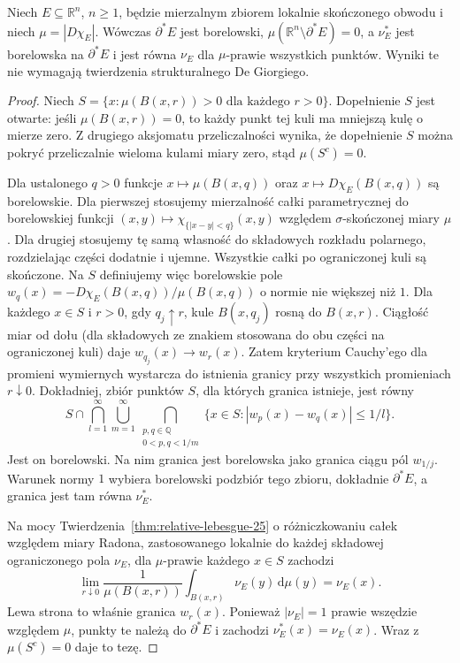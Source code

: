 \begin{lemat}
\label{lem:reduced-boundary-measurable-29}
Niech $E\subseteq\mathbb R^n$, $n\ge1$, będzie
mierzalnym zbiorem lokalnie skończonego obwodu
i niech $\mu=|D\chi_E|$.
Wówczas $\partial^*E$ jest borelowski,
$\mu(\mathbb R^n\setminus\partial^*E)=0$,
a $\nu_E^*$ jest borelowska na $\partial^*E$
i jest równa $\nu_E$ dla $\mu$-prawie wszystkich
punktów. Wyniki te nie wymagają twierdzenia
strukturalnego De Giorgiego.
\end{lemat}
\begin{proof}
Niech $S=\{x:\mu(B(x,r))>0\text{ dla każdego }r>0\}$.
Dopełnienie $S$ jest otwarte: jeśli $\mu(B(x,r))=0$,
to każdy punkt tej kuli ma mniejszą kulę
o mierze zero. Z drugiego aksjomatu przeliczalności
wynika, że dopełnienie $S$ można pokryć przeliczalnie
wieloma kulami miary zero, stąd $\mu(S^c)=0$.

Dla ustalonego $q>0$ funkcje
$x\mapsto\mu(B(x,q))$ oraz $x\mapsto D\chi_E(B(x,q))$
są borelowskie. Dla pierwszej stosujemy mierzalność
całki parametrycznej do borelowskiej funkcji
$(x,y)\mapsto\chi_{\{|x-y|<q\}}(x,y)$
względem $\sigma$-skończonej miary $\mu$.
Dla drugiej stosujemy tę samą własność do składowych
rozkładu polarnego, rozdzielając części dodatnie
i ujemne. Wszystkie całki po ograniczonej kuli są
skończone. Na $S$ definiujemy więc borelowskie pole
$w_q(x)=-D\chi_E(B(x,q))/\mu(B(x,q))$ o normie
nie większej niż $1$.
Dla każdego $x\in S$ i $r>0$, gdy $q_j\uparrow r$,
kule $B(x,q_j)$ rosną do $B(x,r)$.
Ciągłość miar od dołu (dla składowych ze znakiem
stosowana do obu części na ograniczonej kuli)
daje $w_{q_j}(x)\to w_r(x)$.
Zatem kryterium Cauchy'ego dla promieni wymiernych
wystarcza do istnienia granicy przy wszystkich
promieniach $r\downarrow0$.
Dokładniej, zbiór punktów $S$, dla których
granica istnieje, jest równy
\[
 S\cap\bigcap_{l=1}^\infty\bigcup_{m=1}^\infty
 \bigcap_{\substack{p,q\in\mathbb Q\\0<p,q<1/m}}
 \{x\in S:|w_p(x)-w_q(x)|\le1/l\}.
\]
Jest on borelowski. Na nim granica jest borelowska
jako granica ciągu pól $w_{1/j}$.
Warunek normy $1$ wybiera borelowski podzbiór
tego zbioru, dokładnie $\partial^*E$,
a granica jest tam równa $\nu_E^*$.

Na mocy Twierdzenia~\ref{thm:relative-lebesgue-25}
o różniczkowaniu całek względem miary Radona,
zastosowanego lokalnie do każdej składowej
ograniczonego pola $\nu_E$, dla $\mu$-prawie
każdego $x\in S$ zachodzi
\[
 \lim_{r\downarrow0}\frac{1}{\mu(B(x,r))}
 \int_{B(x,r)}\nu_E(y)\,\mathrm d\mu(y)=\nu_E(x).
\]
Lewa strona to właśnie granica $w_r(x)$.
Ponieważ $|\nu_E|=1$ prawie wszędzie względem
$\mu$, punkty te należą do $\partial^*E$
i zachodzi $\nu_E^*(x)=\nu_E(x)$.
Wraz z $\mu(S^c)=0$ daje to tezę.
\end{proof}

